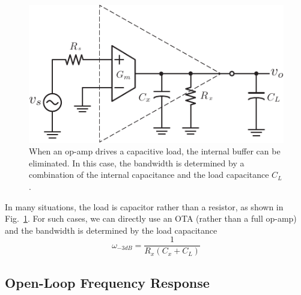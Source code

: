\begin{figure}[tb]
\begin{center}
\includegraphics[scale=1]{ota_amp_capload}
\end{center}
\caption{When an op-amp drives a capacitive load, the internal buffer can be eliminated.  In this case, the bandwidth is determined by a combination of the internal capacitance and the load capacitance $C_L$.} \label{fig:ota_amp_capload}
\end{figure}

In many situations, the load is capacitor rather than a resistor, as shown in Fig.~\ref{fig:ota_amp_capload}.
 For such cases, we can directly use an OTA (rather than a full op-amp) and the bandwidth is determined by the load capacitance
%
\begin{equation}
	{\omega _{ - 3dB}} = \frac{1}{{{R_x}({C_x} + {C_L})}}
\end{equation}
%

%
%
%
 






\subsection{Open-Loop Frequency Response}



